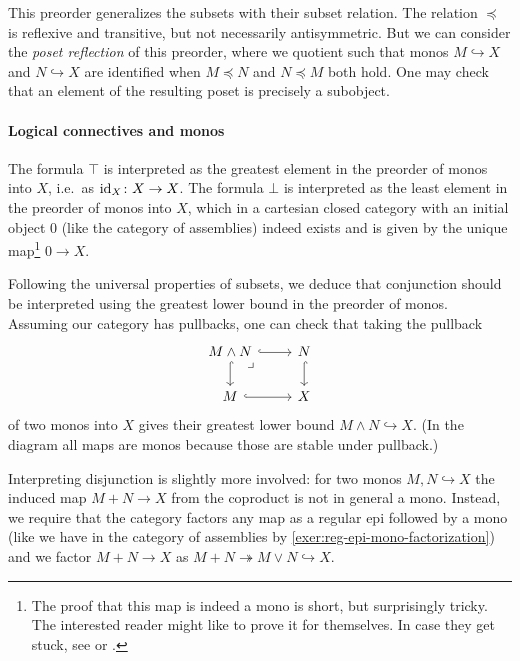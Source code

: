 This preorder generalizes the subsets with their subset relation.
%
The relation \(\preceq\) is reflexive and transitive, but not necessarily
antisymmetric. But we can consider the \emph{poset reflection} of this preorder,
where we quotient such that monos \(M \hookrightarrow X\) and
\(N \hookrightarrow X\) are identified when \(M \preceq N\) and \(N \preceq M\)
both hold.
%
One may check that an element of the resulting poset is precisely a subobject.

\paragraph{Logical connectives and monos}
The formula \(\top\) is interpreted as the greatest element in the preorder of
monos into \(X\), i.e.\ as \(\operatorname{id}_X \colon X \to X\).
%
The formula \(\bot\) is interpreted as the least element in the preorder of
monos into \(X\), which in a cartesian closed category with an initial object
\(0\) (like the category of assemblies) indeed exists and is given by the unique
map\footnote{The proof that this map is indeed a mono is short, but surprisingly
  tricky. The interested reader might like to prove it for themselves. In case
  they get stuck, see \cite[Theorem~6.3]{McLarty1992} or \cite{NCF}.}
\(0 \to X\).

Following the universal properties of subsets, we deduce that conjunction should
be interpreted using the greatest lower bound in the preorder of monos.
%
Assuming our category has pullbacks, one can check that taking the pullback
\[
  \begin{tikzcd}
    M \land N \pbcorner \ar[d,hookrightarrow] \ar[r,hookrightarrow]
    & N \ar[d,hookrightarrow] \\
    M \ar[r,hookrightarrow] & X
  \end{tikzcd}
\]
of two monos into \(X\) gives their greatest lower bound
\(M \land N \hookrightarrow X\).
%
(In the diagram all maps are monos because those are stable under pullback.)

Interpreting disjunction is slightly more involved: for two monos
\({M,N \hookrightarrow X}\) the induced map \(M + N \to X\) from the coproduct is
not in general a mono. Instead, we require that the category factors any map as
a regular epi followed by a mono (like we have in the category of assemblies by
\cref{exer:reg-epi-mono-factorization}) and we factor \(M + N \to X\) as
\(M + N \twoheadrightarrow M \lor N \hookrightarrow X\).

